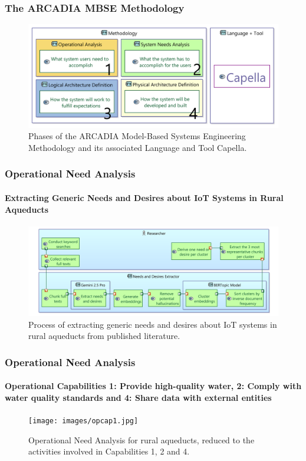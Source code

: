 \documentclass{beamer}
\begin{document}
\begin{frame}
    \frametitle{The ARCADIA MBSE Methodology}

    \begin{figure}
        \centering
        \includegraphics[width=\textwidth]{images/phases_arcadia.png}
        \caption{Phases of the ARCADIA Model-Based Systems Engineering Methodology and its associated Language and Tool Capella.}
    \end{figure}
\end{frame}

\begin{frame}
    \frametitle{\small Operational Need Analysis}
    \framesubtitle{Extracting Generic Needs and Desires about IoT Systems in Rural Aqueducts}

    \begin{figure}
        \centering
        \includegraphics[width=\textwidth]{images/bertopic.png}
        \caption{Process of extracting generic needs and desires about IoT systems in rural aqueducts from published literature.}
    \end{figure}
\end{frame}

\begin{frame}
    \frametitle{\small Operational Need Analysis}
    \framesubtitle{Operational Capabilities 1: Provide high-quality water, 2: Comply with water quality standards and 4: Share data with external entities}

    \begin{figure}
        \centering
        \texttt{[image: images/opcap1.jpg]}
        \caption{Operational Need Analysis for rural aqueducts, reduced to the activities involved in Capabilities 1, 2 and 4.}
    \end{figure}
\end{frame}
\end{document}
